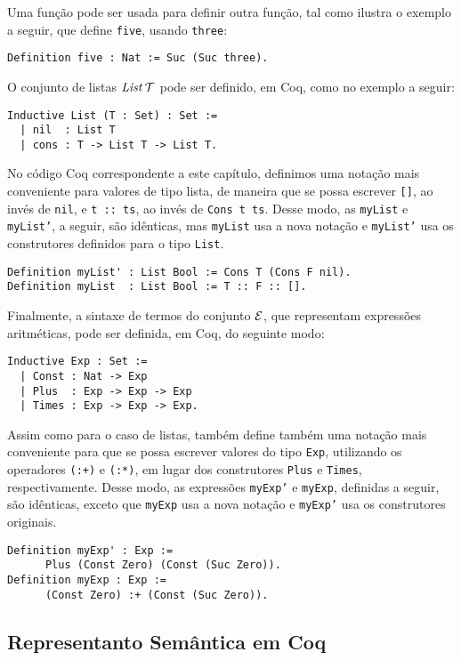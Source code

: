 Uma função pode ser usada para definir outra função, tal como ilustra o exemplo a seguir, que define \texttt{five}, usando \texttt{three}: 
\begin{lstlisting}
Definition five : Nat := Suc (Suc three).
\end{lstlisting}

O conjunto de listas $\textit{List\/}\,\mathcal{T}$ pode ser definido, em Coq, como no exemplo a seguir: 
\begin{lstlisting}
Inductive List (T : Set) : Set :=
  | nil  : List T
  | cons : T -> List T -> List T.
\end{lstlisting}

No código Coq correspondente a este capítulo, definimos uma nota\c{c}\~ao mais conveniente para valores de tipo lista, de maneira que se possa escrever \texttt{[]}, ao inv\'es de \texttt{nil}, e \texttt{t :: ts}, ao inv\'es de \texttt{Cons t ts}. Desse modo, as \texttt{myList} e \texttt{myList'}, a seguir, s\~ao id\^enticas, mas \texttt{myList} usa a nova notação e \texttt{myList'} usa os construtores definidos para o tipo \texttt{List}.
\begin{lstlisting}
Definition myList' : List Bool := Cons T (Cons F nil).
Definition myList  : List Bool := T :: F :: [].
\end{lstlisting}

Finalmente, a  sintaxe de termos do conjunto $\mathcal{E}$, que representam express\~oes aritm\'eticas, pode ser definida, em Coq, do seguinte modo:
\begin{lstlisting}
Inductive Exp : Set :=
  | Const : Nat -> Exp
  | Plus  : Exp -> Exp -> Exp
  | Times : Exp -> Exp -> Exp.
\end{lstlisting}

Assim como para o caso de listas, também define também uma notação mais conveniente para que se possa escrever valores do tipo \texttt{Exp}, utilizando os operadores \texttt{(:+)} e \texttt{(:*)}, em lugar dos construtores \texttt{Plus} e \texttt{Times}, respectivamente. Desse modo, as expressões \texttt{myExp'} e \texttt{myExp}, definidas a seguir, são idênticas, exceto que \texttt{myExp} usa a nova notação e \texttt{myExp'} usa os construtores originais.
\begin{lstlisting}
Definition myExp' : Exp := 
      Plus (Const Zero) (Const (Suc Zero)).
Definition myExp : Exp := 
      (Const Zero) :+ (Const (Suc Zero)).
\end{lstlisting}

\subsection{Representanto Sem\^antica em Coq}

